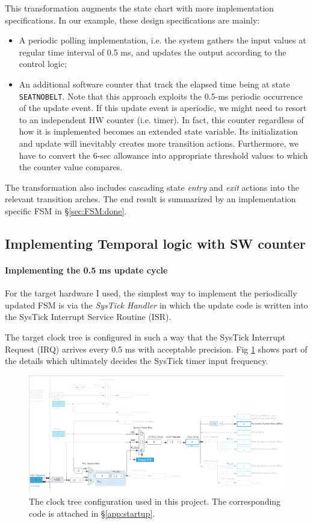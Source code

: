 \documentclass[12pt,a4paper]{scrartcl}
\begin{document}
	This transformation augments the state chart with more implementation specifications. In our example, these design specifications are mainly:
	\begin{itemize}
		\item A periodic polling implementation, i.e. the system gathers the input values at regular time interval of 0.5 ms, and updates the output according to the control logic;
		\item An additional software counter that track the elapsed time being at state \texttt{SEAT\textunderscore NO\textunderscore BELT}.
		Note that this approach exploits the 0.5-ms periodic occurrence of the update event. If this update event is aperiodic, we might need to resort to an independent HW counter (i.e. timer). 
		In fact, this counter regardless of how it is implemented becomes an extended state variable. 
		Its initialization and update will inevitably creates more transition actions.
		Furthermore, we have to convert the 6-sec allowance into appropriate threshold values to which the counter value compares.
	\end{itemize}
	
	The transformation also includes cascading state \textit{entry} and \textit{exit} actions into the relevant transition arches.
	The end result is summarized by an implementation specific FSM in \S \ref{sec:FSM:done}.
	
	\subsection{Implementing Temporal logic with SW counter}
		\paragraph{Implementing the 0.5 ms update cycle} \label{clk_tree}
			For the target hardware I used, the simplest way to implement the periodically updated FSM is via the \textit{SysTick Handler} in which the update code is written into the SysTick Interrupt Service Routine (ISR).
			
			The target clock tree is configured in such a way that the SysTick Interrupt Request (IRQ) arrives every 0.5 ms with acceptable precision. Fig \ref{fig:clock} shows part of the details which ultimately decides the SysTick timer input frequency.			
			\begin{figure}[ht]
				\centering
				\includegraphics[width=0.9 \textwidth]{clock-tree.png}
				\caption{The clock tree configuration used in this project. \newline
					The corresponding code is attached in \S \ref{app:startup}.}
				\label{fig:clock}
			\end{figure}
		
\end{document}
